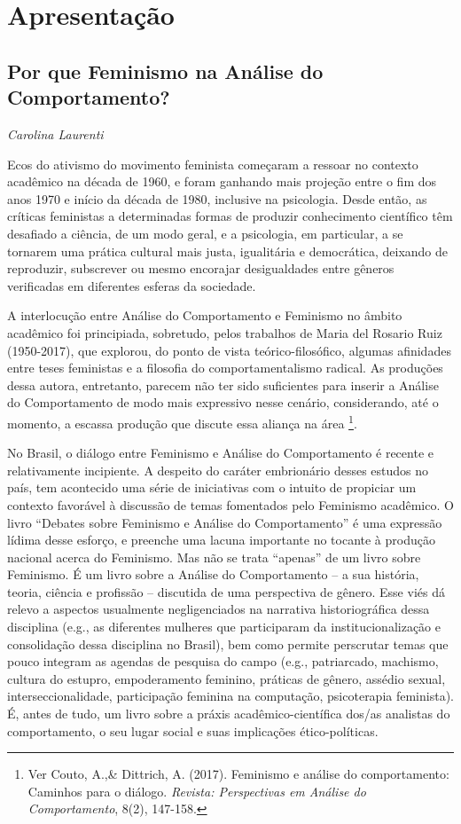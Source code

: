 \chapter*{Apresentação}
\section*{Por que Feminismo na Análise do Comportamento?}
\begin{flushright}
    \emph{Carolina Laurenti}
\end{flushright}

Ecos do ativismo do movimento feminista começaram a ressoar no contexto acadêmico na década de 1960, e foram ganhando mais projeção entre o fim dos anos 1970 e início da década de 1980, inclusive na psicologia. Desde então, as críticas feministas a determinadas formas de produzir conhecimento científico têm desafiado a ciência, de um modo geral, e a psicologia, em particular, a se tornarem uma prática cultural mais justa, igualitária e democrática, deixando de reproduzir, subscrever ou mesmo encorajar desigualdades entre gêneros verificadas em diferentes esferas da sociedade. 

A interlocução entre Análise do Comportamento e Feminismo no âmbito acadêmico foi principiada, sobretudo, pelos trabalhos de Maria del Rosario Ruiz (1950-2017), que explorou, do ponto de vista teórico-filosófico, algumas afinidades entre teses feministas e a filosofia do comportamentalismo radical. As produções dessa autora, entretanto, parecem não ter sido suficientes para inserir a Análise do Comportamento de modo mais expressivo nesse cenário, considerando, até o momento, a escassa produção que discute essa aliança na área \footnote{Ver Couto, A.,\& Dittrich, A. (2017). Feminismo e análise do comportamento: Caminhos para o diálogo. \emph{Revista: Perspectivas em Análise do Comportamento}, 8(2), 147-158.}.

No Brasil, o diálogo entre Feminismo e Análise do Comportamento é recente e relativamente incipiente. A despeito do caráter embrionário desses estudos no país, tem acontecido uma série de iniciativas com o intuito de propiciar um contexto favorável à discussão de temas fomentados pelo Feminismo acadêmico. O livro “Debates sobre Feminismo e Análise do Comportamento” é uma expressão lídima desse esforço, e preenche uma lacuna importante no tocante à produção nacional acerca do Feminismo. Mas não se trata “apenas” de um livro sobre Feminismo. É um livro sobre a Análise do Comportamento – a sua história, teoria, ciência e profissão – discutida de uma perspectiva de gênero. Esse viés dá relevo a aspectos usualmente negligenciados na narrativa historiográfica dessa disciplina (e.g., as diferentes mulheres que participaram da institucionalização e consolidação dessa disciplina no Brasil), bem como permite perscrutar temas que pouco integram as agendas de pesquisa do campo (e.g., patriarcado, machismo, cultura do estupro, empoderamento feminino, práticas de gênero, assédio sexual, interseccionalidade, participação feminina na computação, psicoterapia feminista). É, antes de tudo, um livro sobre a práxis acadêmico-científica dos/as analistas do comportamento, o seu lugar social e suas implicações ético-políticas.

